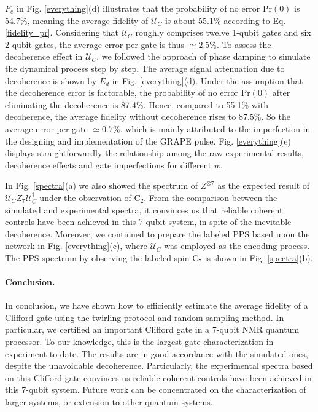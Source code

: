 \documentclass[prl,twocolumn,showpacs]{revtex4-1}
\begin{document}
$F_e$ in Fig. \ref{everything}(d) illustrates that the probability of no error $\text{Pr}(0)$ is 54.7\%, meaning the average fidelity of $\mathcal{U}_{C}$ is about 55.1\% according to Eq. \ref{fidelity_pr}. Considering that  $\mathcal{U}_{C}$ roughly comprises twelve 1-qubit gates and six 2-qubit gates, the average error per gate is thus $\simeq 2.5\%$. To assess the decoherence effect in $\mathcal{U}_{C}$, we followed the approach of phase damping \cite{Vandersypen2001} to simulate the dynamical process step by step. The average signal attenuation due to decoherence is shown by $E_d$ in Fig. \ref{everything}(d). Under the assumption that the decoherence error is factorable, the probability of no error $\text{Pr}(0)$ after eliminating the decoherence is 87.4\%. Hence, compared to 55.1\% with decoherence, the average fidelity without decoherence rises to 87.5\%. So the average error per gate $\simeq 0.7\%$. which is mainly attributed to the imperfection in the designing and implementation of the GRAPE pulse.  Fig. \ref{everything}(e) displays straightforwardly the relationship among the raw experimental results, decoherence effects and gate imperfections for different $w$.

In Fig. \ref{spectra}(a) we also showed the spectrum of $Z^{\otimes 7}$ as the expected result of $\mathcal{U}_{C} Z_7 \mathcal{U}_{C}^{\dagger}$ under the observation of C$_2$. From the comparison between the simulated and experimental spectra, it convinces us that reliable coherent controls have been achieved in this 7-qubit system, in spite of the inevitable decoherence.  Moreover, we continued to prepare the labeled PPS based upon the network in Fig. \ref{everything}(c), where $\mathcal{U}_{C}$ was employed as the encoding process. The PPS spectrum by observing the labeled spin C$_7$ is shown in Fig. \ref{spectra}(b).

\paragraph*{Conclusion.}
In conclusion, we have shown how to efficiently estimate the average fidelity of a Clifford gate using the twirling protocol and random sampling method. In particular, we certified an important Clifford gate in a 7-qubit NMR quantum processor. To our knowledge, this is the largest gate-characterization in experiment to date. The results are in good accordance with the simulated ones, despite the unavoidable decoherence. Particularly, the experimental spectra based on this Clifford gate convinces us reliable coherent controls have been achieved in this 7-qubit system. Future work can be concentrated on the characterization of larger systems, or extension to other quantum systems.
\end{document}
